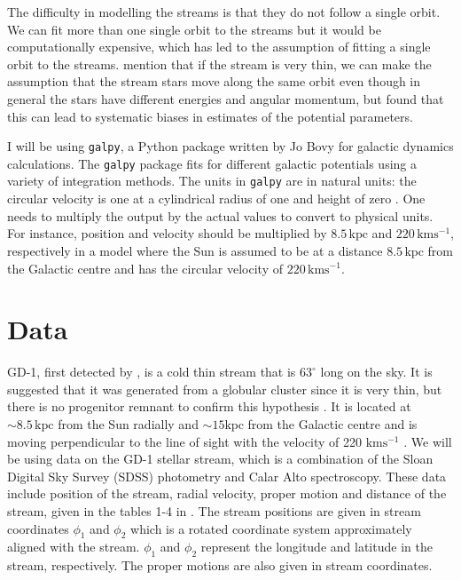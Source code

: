 \documentclass[preprint]{aastex}
\newcommand{\kpc}{\mathrm{kpc}}
\newcommand{\kms}{\mathrm{kms^{-1}}}
\begin{document}
The difficulty in modelling the streams is that they do not follow a single orbit. We can fit more than one single orbit to the streams but it would be computationally expensive, which has led to the assumption of fitting a single orbit to the streams\citep{Bovy2014}. \citet{koposov} mention that if the stream is very thin, we can make the assumption that the stream stars move along the same orbit even though in general the stars have different energies and angular momentum, but \citet{Sanders2013} found that this can lead to systematic biases in estimates of the potential parameters.

I will be using \texttt{galpy}, a Python package written by Jo Bovy \citep{galpy2015} for galactic dynamics calculations. The \texttt{galpy} package fits for different galactic potentials using a variety of integration methods. The units in \texttt{galpy} are in natural units: the circular velocity is one at a cylindrical radius of one and height of zero \citep{galpy2015}. One needs to multiply the output by the actual values to convert to physical units. For instance, position and velocity should be multiplied by $8.5 \, \kpc$ and $220 \, \kms$, respectively  in a model where the Sun is assumed to be at a distance $8.5 \, \kpc $ from the Galactic centre and has the circular velocity of $220 \, \kms$.



\section{Data}
GD-1, first detected by \citet{GD2006}, is a cold thin stream that is $63^{\circ}$ long on the sky. It is suggested that it was generated from a globular cluster since it is very thin, but there is no progenitor remnant to confirm this hypothesis \citep{Sanders2013}. It is located at $\sim 8.5 \, \kpc$ from the Sun radially and $ \sim15 \kpc$ from the Galactic centre and is moving perpendicular to the line of sight with the velocity of 220 $\kms$ \citep{koposov}.
We will be using data on the GD-1 stellar stream, which is a combination of the Sloan Digital Sky Survey (SDSS) photometry and Calar Alto spectroscopy. These data include position of the stream, radial velocity, proper motion and distance of the stream, given in the tables 1-4 in \citet{koposov}. The stream positions are given in stream coordinates $\phi_1$ and $\phi_2$ which is a rotated coordinate system approximately aligned with the stream. $\phi_1$ and $\phi_2$ represent the longitude and latitude in the stream, respectively. The proper motions are also given in stream coordinates. 
\end{document}
